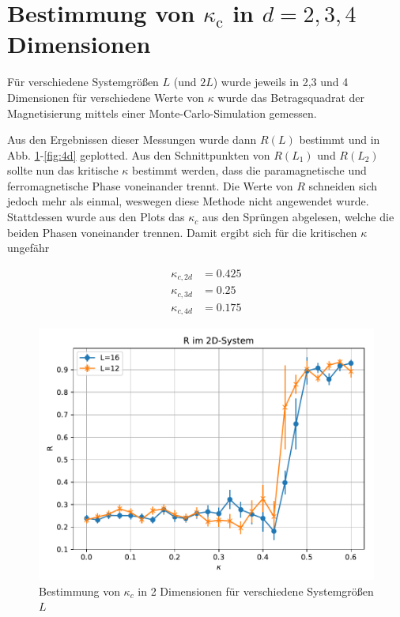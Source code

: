 \documentclass[10pt,a4paper]{article}
\begin{document}
\section{Bestimmung von $\kappa_\text{c}$ in $d=2,3,4$ Dimensionen}

Für verschiedene Systemgrößen $L$ (und $2L$) wurde jeweils in 2,3 und 4 Dimensionen für verschiedene
Werte von $\kappa$ wurde das Betragsquadrat der Magnetisierung mittels
einer Monte-Carlo-Simulation gemessen.

Aus den Ergebnissen dieser Messungen wurde dann $R(L)$ bestimmt und in
Abb. \ref{fig:2d}-\ref{fig:4d} geplotted.
Aus den Schnittpunkten von $R(L_1)$ und $R(L_2)$ sollte nun das kritische $\kappa$
bestimmt werden, dass die paramagnetische und ferromagnetische Phase voneinander
trennt. Die Werte von $R$ schneiden sich jedoch mehr als einmal, weswegen diese
Methode nicht angewendet wurde. Stattdessen wurde aus den Plots das $\kappa_c$
aus den Sprüngen abgelesen, welche die beiden Phasen voneinander trennen.
\newpage
Damit ergibt sich für die kritischen $\kappa$ ungefähr

\begin{align*}
  \kappa_{c,2d} &= 0.425 \\
  \kappa_{c,3d} &= 0.25 \\
  \kappa_{c,4d} &= 0.175
\end{align*}


\begin{figure}
  \centering
  \includegraphics[width=\textwidth]{../figures/2dR.pdf}
  \caption{Bestimmung von $\kappa_c$ in 2 Dimensionen für verschiedene Systemgrößen $L$}\label{fig:2d}
\end{figure}
\end{document}
